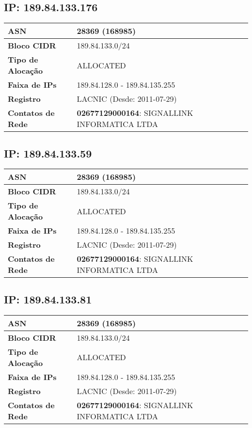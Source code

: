     \subsection{IP: 189.84.133.176}
    \begin{tabular}{|l|l|}
    \hline
    \textbf{ASN} & 28369 (168985) \\ \hline
    \textbf{Bloco CIDR} & 189.84.133.0/24 \\ \hline
    \textbf{Tipo de Alocação} & ALLOCATED \\ \hline
    \textbf{Faixa de IPs} & 189.84.128.0 - 189.84.135.255 \\ \hline
    \textbf{Registro} & LACNIC (Desde: 2011-07-29) \\ \hline
        
\textbf{Contatos de Rede} & \textbf{02677129000164}: SIGNALLINK INFORMATICA LTDA 
\\ \hline
\end{tabular}


    \subsection{IP: 189.84.133.59}
    \begin{tabular}{|l|l|}
    \hline
    \textbf{ASN} & 28369 (168985) \\ \hline
    \textbf{Bloco CIDR} & 189.84.133.0/24 \\ \hline
    \textbf{Tipo de Alocação} & ALLOCATED \\ \hline
    \textbf{Faixa de IPs} & 189.84.128.0 - 189.84.135.255 \\ \hline
    \textbf{Registro} & LACNIC (Desde: 2011-07-29) \\ \hline
        
\textbf{Contatos de Rede} & \textbf{02677129000164}: SIGNALLINK INFORMATICA LTDA 
\\ \hline
\end{tabular}


    \subsection{IP: 189.84.133.81}
    \begin{tabular}{|l|l|}
    \hline
    \textbf{ASN} & 28369 (168985) \\ \hline
    \textbf{Bloco CIDR} & 189.84.133.0/24 \\ \hline
    \textbf{Tipo de Alocação} & ALLOCATED \\ \hline
    \textbf{Faixa de IPs} & 189.84.128.0 - 189.84.135.255 \\ \hline
    \textbf{Registro} & LACNIC (Desde: 2011-07-29) \\ \hline
        
\textbf{Contatos de Rede} & \textbf{02677129000164}: SIGNALLINK INFORMATICA LTDA 
\\ \hline
\end{tabular}


